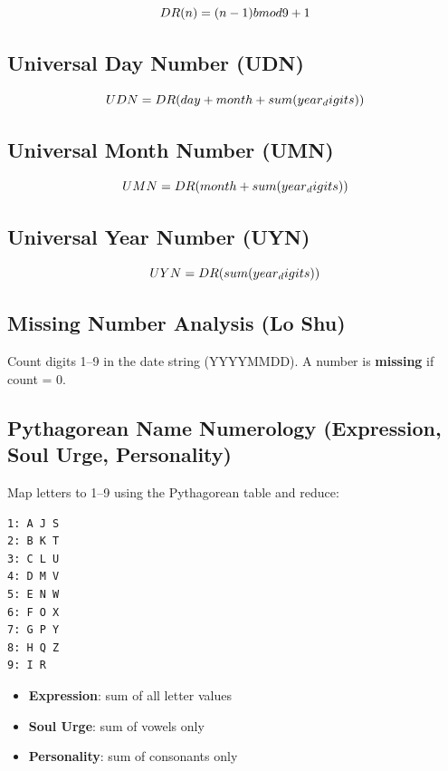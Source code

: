 \documentclass[
  american,
  11pt,
  oneside,
  openany]{article}
\providecommand{\tightlist}{%
  \setlength{\itemsep}{0pt}\setlength{\parskip}{0pt}}
\begin{document}
\[
DR(n) = (n - 1) \\bmod 9 + 1
\]

\subsection{Universal Day Number (UDN)}\label{universal-day-number-udn}

\[
UDN = DR(day + month + sum(year\\_digits))
\]

\subsection{Universal Month Number
(UMN)}\label{universal-month-number-umn}

\[
UMN = DR(month + sum(year\\_digits))
\]

\subsection{Universal Year Number
(UYN)}\label{universal-year-number-uyn}

\[
UYN = DR(sum(year\\_digits))
\]

\subsection{Missing Number Analysis (Lo
Shu)}\label{missing-number-analysis-lo-shu}

Count digits 1--9 in the date string (YYYYMMDD). A number is
\textbf{missing} if count = 0.

\subsection{Pythagorean Name Numerology (Expression, Soul Urge,
Personality)}\label{pythagorean-name-numerology-expression-soul-urge-personality}

Map letters to 1--9 using the Pythagorean table and reduce:

\begin{verbatim}
1: A J S
2: B K T
3: C L U
4: D M V
5: E N W
6: F O X
7: G P Y
8: H Q Z
9: I R
\end{verbatim}

\begin{itemize}
\tightlist
\item
  \textbf{Expression}: sum of all letter values
\item
  \textbf{Soul Urge}: sum of vowels only
\item
  \textbf{Personality}: sum of consonants only
\end{itemize}
\end{document}
